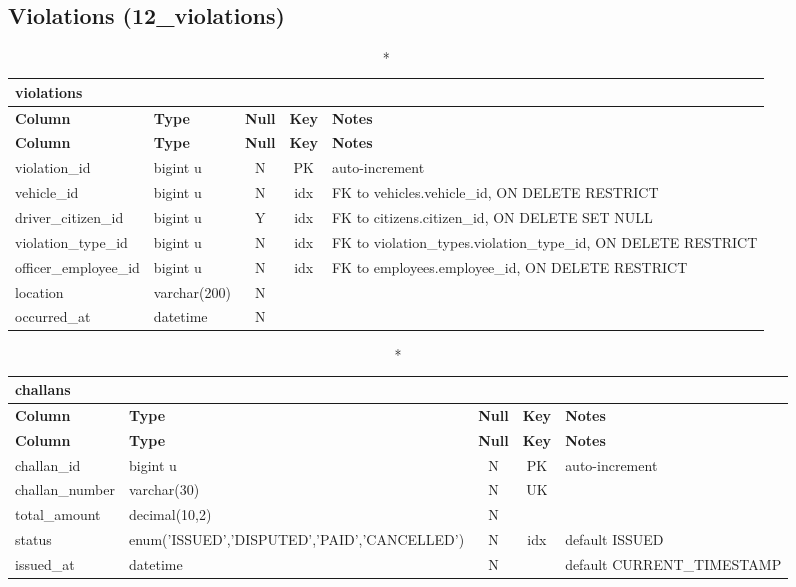 \subsection*{Violations (12\_violations)}
\begin{longtable}{@{}p{3.4cm}p{2.9cm}c c p{5.6cm}@{}}
\caption*{\textbf{violations}}\\
\toprule \textbf{Column} & \textbf{Type} & \textbf{Null} & \textbf{Key} & \textbf{Notes} \\ \midrule \endfirsthead
\toprule \textbf{Column} & \textbf{Type} & \textbf{Null} & \textbf{Key} & \textbf{Notes} \\ \midrule \endhead
\bottomrule \endlastfoot
violation\_\allowbreak{}id & bigint u & N & PK & auto-increment \\
vehicle\_\allowbreak{}id & bigint u & N & idx & FK to vehicles.vehicle\_\allowbreak{}id, ON DELETE RESTRICT \\
driver\_\allowbreak{}citizen\_\allowbreak{}id & bigint u & Y & idx & FK to citizens.citizen\_\allowbreak{}id, ON DELETE SET NULL \\
violation\_\allowbreak{}type\_\allowbreak{}id & bigint u & N & idx & FK to violation\_\allowbreak{}types.violation\_\allowbreak{}type\_\allowbreak{}id, ON DELETE RESTRICT \\
officer\_\allowbreak{}employee\_\allowbreak{}id & bigint u & N & idx & FK to employees.employee\_\allowbreak{}id, ON DELETE RESTRICT \\
location & varchar(200) & N &  &  \\
occurred\_\allowbreak{}at & datetime & N &  &  \\
\end{longtable}
\vspace{-0.4em}
\begin{longtable}{@{}p{3.4cm}p{2.9cm}c c p{5.6cm}@{}}
\caption*{\textbf{challans}}\\
\toprule \textbf{Column} & \textbf{Type} & \textbf{Null} & \textbf{Key} & \textbf{Notes} \\ \midrule \endfirsthead
\toprule \textbf{Column} & \textbf{Type} & \textbf{Null} & \textbf{Key} & \textbf{Notes} \\ \midrule \endhead
\bottomrule \endlastfoot
challan\_\allowbreak{}id & bigint u & N & PK & auto-increment \\
challan\_\allowbreak{}number & varchar(30) & N & UK &  \\
total\_\allowbreak{}amount & decimal(10,2) & N &  &  \\
status & enum('ISSUED',\allowbreak{}'DISPUTED',\allowbreak{}'PAID',\allowbreak{}'CANCELLED') & N & idx & default ISSUED \\
issued\_\allowbreak{}at & datetime & N &  & default CURRENT\_\allowbreak{}TIMESTAMP \\
\end{longtable}
